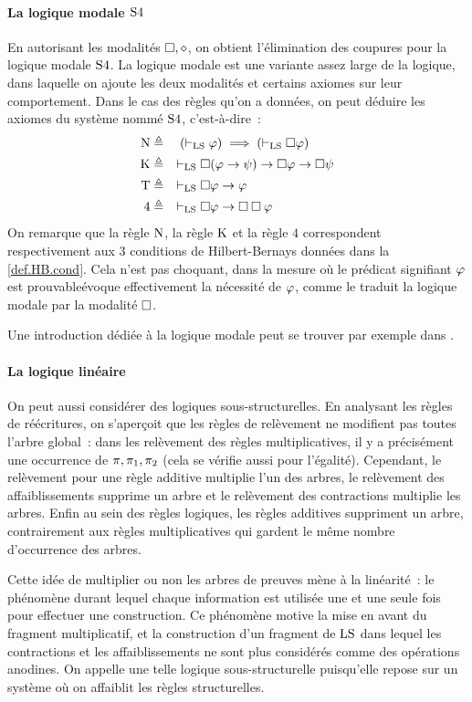 \paragraph{La logique modale $\mathrm{S}4$}
En autorisant les modalités $\mathbin{\square},\mathbin{\diamond}$, on obtient l'élimination des
coupures pour la logique modale $\mathrm{S}4$. La logique modale est une variante
assez large de la logique, dans laquelle on ajoute les deux modalités et
certains axiomes sur leur comportement. Dans le cas des règles qu'on a données,
on peut déduire les axiomes du système nommé $\mathrm{S}4$, c'est-à-dire~:
\begin{align*}
  \operatorname{N} &\triangleq \quad(\vdash_{\operatorname{LS}} \varphi) \implies (\vdash_{\operatorname{LS}}\mathbin{\square}\varphi) \\
  \operatorname{K} &\triangleq \quad\vdash_{\operatorname{LS}} \mathbin{\square}(\varphi \to \psi) \to \mathbin{\square} \varphi \to
  \mathbin{\square}\psi\\
  \operatorname{T} &\triangleq \quad\vdash_{\operatorname{LS}} \mathbin{\square}\varphi \to \varphi\\
  4 &\triangleq \quad\vdash_{\operatorname{LS}} \mathbin{\square}\varphi\to\mathbin{\square}\mathbin{\square}\varphi
\end{align*}
On remarque que la règle $\operatorname{N}$, la règle $\operatorname{K}$ et la règle $4$ correspondent
respectivement aux $3$ conditions de Hilbert-Bernays données dans la
\cref{def.HB.cond}. Cela n'est pas choquant, dans la mesure où le prédicat
signifiant \og $\varphi$ est prouvable\fg évoque effectivement la nécessité de
$\varphi$, comme le traduit la logique modale par la modalité $\mathbin{\square}$.

Une introduction dédiée à la logique modale peut se trouver par exemple dans
\cite{BlackburnDeRijkeVenema2001}.

\paragraph{La logique linéaire}
On peut aussi considérer des logiques sous-structurelles. En analysant les
règles de réécritures, on s'aperçoit que les règles de relèvement ne modifient
pas toutes l'arbre global~: dans les relèvement des règles multiplicatives, il
y a précisément une occurrence de $\pi,\pi_1,\pi_2$ (cela se vérifie
aussi pour l'égalité). Cependant, le relèvement pour une règle additive
multiplie l'un des arbres, le relèvement des affaiblissements supprime un arbre
et le relèvement des contractions multiplie les arbres. Enfin au sein des règles
logiques, les règles additives suppriment un arbre, contrairement aux règles
multiplicatives qui gardent le même nombre d'occurrence des arbres.

Cette idée de multiplier ou non les arbres de preuves mène à la linéarité~: le
phénomène durant lequel chaque information est utilisée une et une seule fois
pour effectuer une construction. Ce phénomène motive la mise en avant du
fragment multiplicatif, et la construction d'un fragment de $\operatorname{LS}$ dans lequel
les contractions et les affaiblissements ne sont plus considérés comme des
opérations anodines. On appelle une telle logique \og sous-structurelle\fg
puisqu'elle repose sur un système où on affaiblit les règles structurelles.

